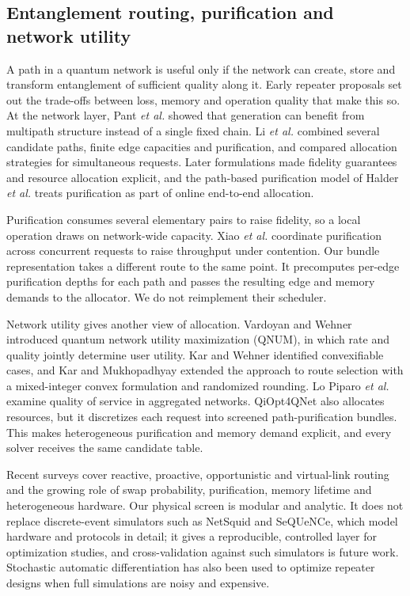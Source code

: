 \documentclass[pdflatex,sn-nature]{sn-jnl}
\theoremstyle{plain}
\theoremstyle{remark}
\begin{document}
\subsection{Entanglement routing, purification and network utility}

A path in a quantum network is useful only if the network can create, store and transform entanglement of sufficient quality along it. Early repeater proposals set out the trade-offs between loss, memory and operation quality that make this so\cite{briegel1998,dur1999,sangouard2011,azuma2023}. At the network layer, Pant \emph{et al.} showed that generation can benefit from multipath structure instead of a single fixed chain\cite{pant2019}. Li \emph{et al.} combined several candidate paths, finite edge capacities and purification, and compared allocation strategies for simultaneous requests\cite{li2021}. Later formulations made fidelity guarantees and resource allocation explicit\cite{halder2024}, and the path-based purification model of Halder \emph{et al.} treats purification as part of online end-to-end allocation\cite{halder2026}.

Purification consumes several elementary pairs to raise fidelity, so a local operation draws on network-wide capacity. Xiao \emph{et al.} coordinate purification across concurrent requests to raise throughput under contention\cite{xiao2024}. Our bundle representation takes a different route to the same point. It precomputes per-edge purification depths for each path and passes the resulting edge and memory demands to the allocator. We do not reimplement their scheduler.

Network utility gives another view of allocation. Vardoyan and Wehner introduced quantum network utility maximization (QNUM), in which rate and quality jointly determine user utility\cite{vardoyan2023}. Kar and Wehner identified convexifiable cases\cite{kar2025}, and Kar and Mukhopadhyay extended the approach to route selection with a mixed-integer convex formulation and randomized rounding\cite{kar2026}. Lo Piparo \emph{et al.} examine quality of service in aggregated networks\cite{lopiparo2025}. QiOpt4QNet also allocates resources, but it discretizes each request into screened path-purification bundles. This makes heterogeneous purification and memory demand explicit, and every solver receives the same candidate table.

Recent surveys cover reactive, proactive, opportunistic and virtual-link routing and the growing role of swap probability, purification, memory lifetime and heterogeneous hardware\cite{abane2025}. Our physical screen is modular and analytic. It does not replace discrete-event simulators such as NetSquid\cite{coopmans2021} and SeQUeNCe\cite{wu2021}, which model hardware and protocols in detail; it gives a reproducible, controlled layer for optimization studies, and cross-validation against such simulators is future work. Stochastic automatic differentiation has also been used to optimize repeater designs when full simulations are noisy and expensive\cite{avis2025}.
\end{document}
